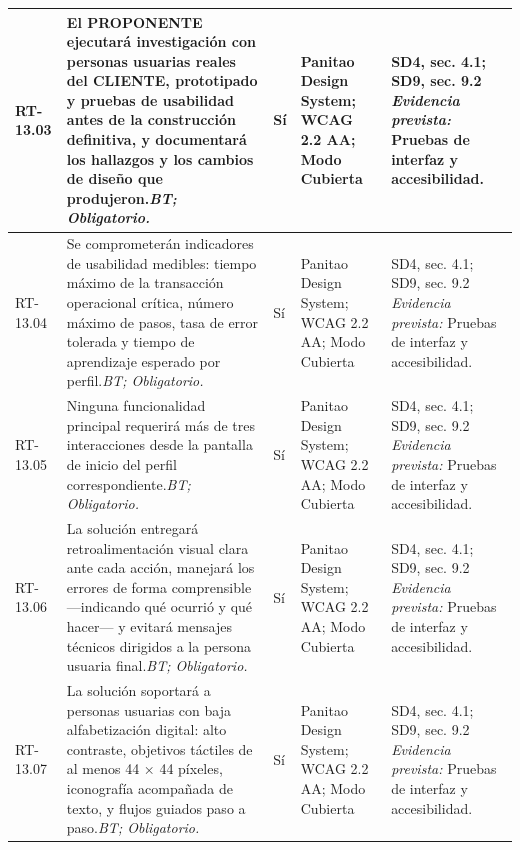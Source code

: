 \begin{paginaHorizontalSynaptix}
\begin{longtable}{|L{0.09\AnchoMatrizTDoce}|L{0.385\AnchoMatrizTDoce}|L{0.065\AnchoMatrizTDoce}|L{0.18\AnchoMatrizTDoce}|L{0.28\AnchoMatrizTDoce}|}
RT-\allowbreak{}13.\allowbreak{}03 &
El PROPONENTE ejecutará investigación con personas usuarias reales del CLIENTE, prototipado y pruebas de usabilidad antes de la construcción definitiva, y documentará los hallazgos y los cambios de diseño que produjeron.\newline\textit{BT; Obligatorio.} &
Sí &
Panitao Design System; WCAG 2.2 AA; Modo Cubierta &
SD4, sec. 4.1; SD9, sec. 9.2 \newline\textit{Evidencia prevista:} Pruebas de interfaz y accesibilidad. \\ \hline

RT-\allowbreak{}13.\allowbreak{}04 &
Se comprometerán indicadores de usabilidad medibles: tiempo máximo de la transacción operacional crítica, número máximo de pasos, tasa de error tolerada y tiempo de aprendizaje esperado por perfil.\newline\textit{BT; Obligatorio.} &
Sí &
Panitao Design System; WCAG 2.2 AA; Modo Cubierta &
SD4, sec. 4.1; SD9, sec. 9.2 \newline\textit{Evidencia prevista:} Pruebas de interfaz y accesibilidad. \\ \hline

RT-\allowbreak{}13.\allowbreak{}05 &
Ninguna funcionalidad principal requerirá más de tres interacciones desde la pantalla de inicio del perfil correspondiente.\newline\textit{BT; Obligatorio.} &
Sí &
Panitao Design System; WCAG 2.2 AA; Modo Cubierta &
SD4, sec. 4.1; SD9, sec. 9.2 \newline\textit{Evidencia prevista:} Pruebas de interfaz y accesibilidad. \\ \hline

RT-\allowbreak{}13.\allowbreak{}06 &
La solución entregará retroalimentación visual clara ante cada acción, manejará los errores de forma comprensible —indicando qué ocurrió y qué hacer— y evitará mensajes técnicos dirigidos a la persona usuaria final.\newline\textit{BT; Obligatorio.} &
Sí &
Panitao Design System; WCAG 2.2 AA; Modo Cubierta &
SD4, sec. 4.1; SD9, sec. 9.2 \newline\textit{Evidencia prevista:} Pruebas de interfaz y accesibilidad. \\ \hline

RT-\allowbreak{}13.\allowbreak{}07 &
La solución soportará a personas usuarias con baja alfabetización digital: alto contraste, objetivos táctiles de al menos 44 × 44 píxeles, iconografía acompañada de texto, y flujos guiados paso a paso.\newline\textit{BT; Obligatorio.} &
Sí &
Panitao Design System; WCAG 2.2 AA; Modo Cubierta &
SD4, sec. 4.1; SD9, sec. 9.2 \newline\textit{Evidencia prevista:} Pruebas de interfaz y accesibilidad. \\ \hline


\end{longtable}
\end{paginaHorizontalSynaptix}
